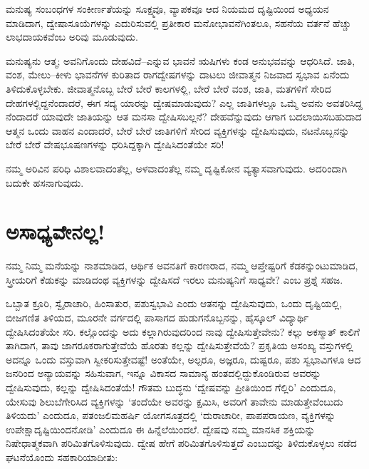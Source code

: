 ಮನುಷ್ಯ ಸಂಬಂಧಗಳ ಸಂಕೀರ್ಣತೆಯನ್ನು ಸೂಕ್ಷ್ಮವೂ, ವ್ಯಾಪಕವೂ ಆದ ನಿಯಮದ ದೃಷ್ಟಿಯಿಂದ ಅಧ್ಯಯನ ಮಾಡಿದಾಗ, ದ್ವೇಷಾಸೂಯೆಗಳನ್ನು ಎದುರಿಸುವಲ್ಲಿ ಪ್ರತೀಕಾರ ಮನೋ\-ಭಾವನೆ\-ಗಿಂತಲೂ, ಸಹನೆಯ ವರ್ತನೆ ಹೆಚ್ಚು ಲಾಭದಾಯಕವೆಂಬ ಅರಿವು ಮೂಡುವುದು.

ಮನುಷ್ಯನು ಆತ್ಮ; ಅವನಿಗೊಂದು ದೇಹವಿದೆ–ಎನ್ನುವ ಭಾವನೆ ಋಷಿಗಳು ಕಂಡ ಅನುಭವವನ್ನು ಆಧರಿಸಿದೆ. ಜಾತಿ, ವಂಶ, ಮೇಲು–ಕೀಳು ಭಾವನೆಗಳ ಕುರಿತಾದ ರಾಗದ್ವೇಷಗಳನ್ನು ದಾಟಲು ಜೀವಾತ್ಮನ ನಿಜವಾದ ಸ್ವಭಾವ ಏನೆಂದು ತಿಳಿದುಕೊಳ್ಳಬೇಕು. ಜೀವಾತ್ಮನೊಬ್ಬ ಬೇರೆ ಬೇರೆ ಕಾಲಗಳಲ್ಲಿ, ಬೇರೆ ಬೇರೆ ವಂಶ, ಜಾತಿ, ಮತಗಳಿಗೆ ಸೇರಿದ ದೇಹಗಳಲ್ಲಿದ್ದನೆಂದಾದರೆ, ಈಗ ಸದ್ಯ ಯಾರನ್ನು ದ್ವೇಷಮಾಡುವುದು? ಎಲ್ಲ ಜಾತಿಗಳಲ್ಲೂ ಒಮ್ಮೆ ಅವನು ಅವತರಿಸಿದ್ದ ನೆಂದಾದರೆ ಯಾವುದೇ ಜಾತಿಯನ್ನು ಆತ ಮನಸಾ ದ್ವೇಷಿಸಬಲ್ಲನೆ? ದೇಹವೆನ್ನುವುದು ಆಗಾಗ ಬದಲಾಯಿಸಬಹುದಾದ ಆತ್ಮನ ಒಂದು ವಾಹನ ಎಂದಾದರೆ, ಬೇರೆ ಬೇರೆ ಜಾತಿಗಳಿಗೆ ಸೇರಿದ ವ್ಯಕ್ತಿಗಳನ್ನು ದ್ವೇಷಿಸುವುದು, ನಟನೊಬ್ಬನನ್ನು ಬೇರೆ ಬೇರೆ ವೇಷಭೂಷಣಗಳನ್ನು ಧರಿಸಿದ್ದಕ್ಕಾಗಿ ದ್ವೇಷಿಸಿದಂತೆಯೇ ಸರಿ!

ನಮ್ಮ ಅರಿವಿನ ಪರಿಧಿ ವಿಶಾಲವಾದಂತೆಲ್ಲ, ಅಳವಾದಂತೆಲ್ಲ ನಮ್ಮ ದೃಷ್ಟಿಕೋನ ವ್ಯತ್ಯಾಸವಾಗುವುದು. ಅದರಿಂದಾಗಿ ಬದುಕೇ ಹಸನಾಗುವುದು.


\section*{ಅಸಾಧ್ಯವೇನಲ್ಲ!}

\vskip -7pt

ನಮ್ಮ ನಿಮ್ಮ ಮನೆಯನ್ನು ನಾಶಮಾಡಿದ, ಆರ್ಥಿಕ ಅವನತಿಗೆ ಕಾರಣರಾದ, ನಮ್ಮ ಆಪ್ತೇಷ್ಟರಿಗೆ ಕೆಡಕನ್ನುಂಟುಮಾಡಿದ, ಸ್ತ್ರೀಯರಿಗೆ ಕೆಡುಕನ್ನು ಮಾಡಿದಂಥ ವ್ಯಕ್ತಿಗಳನ್ನು ದ್ವೇಷಿಸದೆ ಇರಲು ಮನುಷ್ಯನಿಗೆ ಸಾಧ್ಯವೇ? ಎಂಬ ಪ್ರಶ್ನೆ ಸಹಜ.

ಒಬ್ಬಾತ ಕ್ರೂರಿ, ಸ್ವೈರಾಚಾರಿ, ಹಿಂಸಾತುರ, ಪಶುಸ್ವಭಾವಿ ಎಂದು ಆತನನ್ನು ದ್ವೇಷಿಸುವುದು, ಒಂದು ದೃಷ್ಟಿಯಲ್ಲಿ, ಬೀಜಗಣಿತ ತಿಳಿಯದ, ಮೂರನೇ ವರ್ಗದಲ್ಲಿ ಪಾಸಾಗದ ಹುಡುಗನೊಬ್ಬನನ್ನು, ಹೈಸ್ಕೂಲ್ ವಿದ್ಯಾರ್ಥಿ ದ್ವೇಷಿಸಿದಂತೆಯೇ ಸರಿ. ಕಲ್ಲೊಂದನ್ನು ಅದು ಕಲ್ಲಾಗಿರುವುದರಿಂದ ನಾವು ದ್ವೇಷಿಸುತ್ತೇವೇನು? ಕಲ್ಲು ಅಕಸ್ಮಾತ್ ಕಾಲಿಗೆ ತಾಗಿದಾಗ, ತಾವು ಜಾಗರೂಕರಾಗುತ್ತೇವೆಯೆ ಹೊರತು ಕಲ್ಲನ್ನು ದ್ವೇಷಿಸುತ್ತೇವೆಯೆ? ಪ್ರಕೃತಿಯ ಅಸಂಖ್ಯ ವಸ್ತುಗಳಲ್ಲಿ ಅದನ್ನೂ ಒಂದು ವಸ್ತುವಾಗಿ ಸ್ವೀಕರಿಸುತ್ತೇವಷ್ಟೆ! ಅಂತೆಯೇ, ಅಲ್ಪರೂ, ಅಜ್ಞರೂ, ದುಷ್ಟರೂ, ಪಶು ಸ್ವಭಾವಿಗಳೂ ಆದ ಜನರಿಂದ ಅನ್ಯಾಯವನ್ನು ಸಹಿಸುವಾಗ, ಇನ್ನೂ ವಿಕಾಸದ ಸಾಮಾನ್ಯ ಹಂತದಲ್ಲಿದ್ದುಕೊಂಡಿರುವ ಅವರನ್ನು ದ್ವೇಷಿಸುವುದು, ಕಲ್ಲನ್ನು ದ್ವೇಷಿಸಿದಂತೆಯೆ! ಗೌತಮ ಬುದ್ಧನು ‘ದ್ವೇಷವನ್ನು ಪ್ರೀತಿಯಿಂದ ಗೆಲ್ಲಿರಿ’ ಎಂದುದೂ, ಯೇಸುವು ಶಿಲುಬೆಗೇರಿಸಿದ ವ್ಯಕ್ತಿಗಳನ್ನು ‘ತಂದೆಯೇ ಅವರನ್ನು ಕ್ಷಮಿಸಿ, ಅವರಿಗೆ ತಾವೇನು ಮಾಡುತ್ತೇವೆಂಬುದು ತಿಳಿಯದು’ ಎಂದುದೂ, ಪತಂಜಲಿಮಹರ್ಷಿ ಯೋಗಸೂತ್ರದಲ್ಲಿ ‘ದುರಾಚಾರೀ, ಪಾಪಪರಾಯಣ, ವ್ಯಕ್ತಿಗಳನ್ನು ಉಪೇಕ್ಷಾದೃಷ್ಟಿಯಿಂದ\break ನೋಡಿ’ ಎಂದುದೂ ಈ ಹಿನ್ನೆಲೆಯಿಂದಲೆ. ದ್ವೇಷವು ನಮ್ಮ ಮಾನಸಿಕ ಶಕ್ತಿಯನ್ನು ನಿಷೇಧಾತ್ಮಕವಾಗಿ ಪರಿಮಿತಗೊಳಿಸುವುದು. ದ್ವೇಷ ಹೇಗೆ ಪರಿಮಿತಗೊಳಿಸುತ್ತದೆ ಎಂಬುದನ್ನು ತಿಳಿದುಕೊಳ್ಳಲು ನಡೆದ ಘಟನೆಯೊಂದು ಸಹಕಾರಿಯಾದೀತು:

